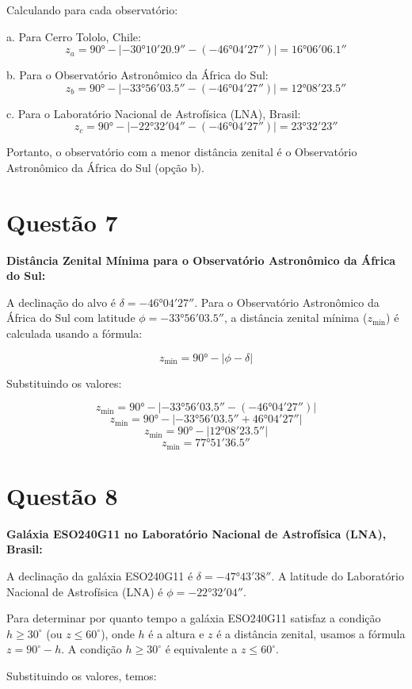 \documentclass[a4paper, 12pt]{article}
\begin{document}
Calculando para cada observatório:

a. Para Cerro Tololo, Chile:
\[z_a = 90° - |-30°10'20.9'' - (-46°04'27'')| = 16°06'06.1''\]

b. Para o Observatório Astronômico da África do Sul:
\[z_b = 90° - |-33°56'03.5'' - (-46°04'27'')| = 12°08'23.5''\]

c. Para o Laboratório Nacional de Astrofísica (LNA), Brasil:
\[z_c = 90° - |-22°32'04'' - (-46°04'27'')| = 23°32'23''\]

Portanto, o observatório com a menor distância zenital é o Observatório Astronômico da África do Sul (opção b).


\section*{Questão 7}

\textbf{Distância Zenital Mínima para o Observatório Astronômico da África do Sul:}

A declinação do alvo é \(\delta = -46°04'27''\). Para o Observatório Astronômico da África do Sul com latitude \(\phi = -33°56'03.5''\), a distância zenital mínima (\(z_{\text{min}}\)) é calculada usando a fórmula:

\[
z_{\text{min}} = 90° - \left| \phi - \delta \right|
\]

Substituindo os valores:

\[
z_{\text{min}} = 90° - \left| -33°56'03.5'' - (-46°04'27'') \right|
\]
\[
z_{\text{min}} = 90° - \left| -33°56'03.5'' + 46°04'27'' \right|
\]
\[
z_{\text{min}} = 90° - \left| 12°08'23.5'' \right|
\]
\[
z_{\text{min}} = 77°51'36.5''
\]


\section*{Questão 8}
\textbf{Galáxia ESO240G11 no Laboratório Nacional de Astrofísica (LNA), Brasil:}

A declinação da galáxia ESO240G11 é \(\delta = -47°43'38''\). A latitude do Laboratório Nacional de Astrofísica (LNA) é \(\phi = -22°32'04''\).

Para determinar por quanto tempo a galáxia ESO240G11 satisfaz a condição \(h \geq 30^\circ\) (ou \(z \leq 60^\circ\)), onde \(h\) é a altura e \(z\) é a distância zenital, usamos a fórmula \(z = 90^\circ - h\). A condição \(h \geq 30^\circ\) é equivalente a \(z \leq 60^\circ\).

Substituindo os valores, temos:
\end{document}
